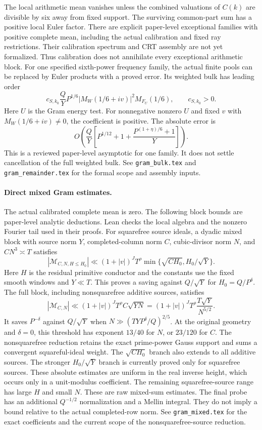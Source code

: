 \documentclass[11pt]{article}
\begin{document}
The local arithmetic mean vanishes unless the combined valuations of
$C(k)$ are divisible by six away from fixed support.
The surviving common-part sum has a positive local Euler factor.
There are explicit paper-level exceptional families with positive complete mean,
including the actual calibration and fixed ray restrictions.
Their calibration spectrum and CRT assembly are not yet formalized.
Thus calibration does not annihilate every exceptional arithmetic block.
For one specified sixth-power frequency family, the actual finite pools
can be replaced by Euler products with a proved error. Its weighted
bulk has leading order
\[
 c_{S,k_0}\frac QY P^{1/6}
 |M_W(1/6+iv)|^2M_{F_U}(1/6),\qquad c_{S,k_0}>0.
\]
Here $U$ is the Gram energy test. For nonnegative nonzero $U$ and fixed
$v$ with $M_W(1/6+iv)\ne0$, the coefficient is positive.
The absolute error is
\[
 O\!\left(\frac QY\left[P^{1/12}+1+
       \frac{P^{(1+\eta)/6}+1}{Y}\right]\right).
\]
This is a reviewed paper-level asymptotic for one family.
It does not settle cancellation of the full weighted bulk.
See \texttt{gram\_bulk.tex} and
\texttt{gram\_remainder.tex} for the formal scope and assembly inputs.

\paragraph{Direct mixed Gram estimates.}
The actual calibrated complete mean is zero. The following block bounds
are paper-level analytic deductions. Lean checks the local algebra and
the nonzero Fourier tail used in their proofs.
For squarefree source
ideals, a dyadic mixed block with source norm $Y$, completed-column
norm $C$, cubic-divisor norm $N$, and $CN^3\asymp T$ satisfies
\[
 |\mathcal M_{C,N,H\le H_0}|
 \ll (1+|v|)^J T^\rho
       \min\{\sqrt{CH_0},H_0/\sqrt Y\}.
\]
Here $H$ is the residual primitive conductor and the constants use the
fixed smooth windows and $Y\ll T$.
This proves a saving against $Q/\sqrt Y$ for $H_0=Q/P^\delta$.
The full block, including nonsquarefree additive sources, satisfies
\[
 |\mathcal M_{C,N}|
 \ll (1+|v|)^J T^\rho C\sqrt{YN}
 = (1+|v|)^J T^\rho\frac{T\sqrt Y}{N^{5/2}}.
\]
It saves $P^{-\delta}$ against $Q/\sqrt Y$ when
$N\gg(TYP^\delta/Q)^{2/5}$.
At the original geometry and $\delta=0$, this threshold has exponent
$13/40$ for $N$, or $23/120$ for $C$.
The nonsquarefree reduction retains the exact prime-power Gauss support
and sums a convergent squareful-ideal weight. The $\sqrt{CH_0}$ branch
also extends to all additive sources. The stronger $H_0/\sqrt Y$ branch
is currently proved only for squarefree sources.
These absolute estimates are uniform in the real inverse height, which
occurs only in a unit-modulus coefficient.
The remaining squarefree-source range has large $H$ and small $N$.
These are raw mixed-sum estimates. The final probe has an additional
$Q^{-1/2}$ normalization and a Mellin integral.
They do not imply a bound relative to the actual completed-row norm.
See \texttt{gram\_mixed.tex} for the exact coefficients and the current
scope of the nonsquarefree-source reduction.
\end{document}
